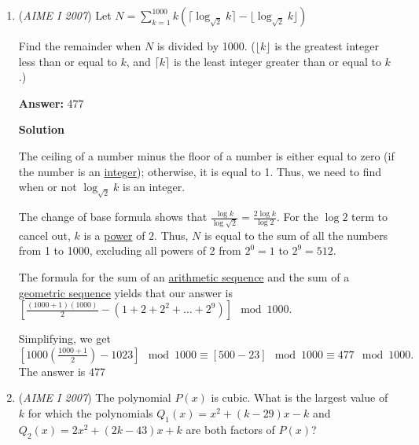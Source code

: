 \begin{enumerate}
 


 In summary, we can draw the following tree, where in $(x,y)$, $x$ represents the current position on the number line, and $y$ represents the number of paths to get there:

 


	\item (\textit{AIME I 2007}) Let 
$N = \sum_{k = 1}^{1000} k ( \lceil \log_{\sqrt{2}} k \rceil  - \lfloor \log_{\sqrt{2}} k \rfloor )$


 Find the remainder when $N$ is divided by 1000.  ($\lfloor{k}\rfloor$ is the greatest integer less than or equal to $k$, and $\lceil{k}\rceil$ is the least integer greater than or equal to $k$.)


 
 \textbf{Answer: }477



\textbf{Solution}

The ceiling of a number minus the floor of a number is either equal to zero (if the number is an \href{https://artofproblemsolving.com/wiki/index.php?title=Integer}{integer}); otherwise, it is equal to 1. Thus, we need to find when or not $\log_{\sqrt{2}} k$ is an integer.

 The change of base formula shows that $\frac{\log k}{\log \sqrt{2}} = \frac{2 \log k}{\log 2}$. For the $\log 2$ term to cancel out, $k$ is a \href{https://artofproblemsolving.com/wiki/index.php?title=Exponent}{power} of $2$. Thus, $N$ is equal to the sum of all the numbers from 1 to 1000, excluding all powers of 2 from $2^0 = 1$ to $2^9 = 512$. 

 The formula for the sum of an \href{https://artofproblemsolving.com/wiki/index.php?title=Arithmetic\_sequence}{arithmetic sequence} and the sum of a \href{https://artofproblemsolving.com/wiki/index.php?title=Geometric\_sequence}{geometric sequence} yields that our answer is $\left[\frac{(1000 + 1)(1000)}{2} - (1 + 2 + 2^2 + \ldots + 2^9)\right] \mod{1000}$.

 Simplifying, we get$\left[1000\left(\frac{1000+1}{2}\right) -1023\right] \mod{1000} \equiv [500-23] \mod{1000} \equiv 477 \mod{1000}.$ The answer is $\boxed{477}$



	\item (\textit{AIME I 2007}) The polynomial $P(x)$ is cubic.  What is the largest value of $k$ for which the polynomials $Q_1(x) = x^2 + (k-29)x - k$ and $Q_2(x) = 2x^2+ (2k-43)x + k$ are both factors of $P(x)$?



\end{enumerate}
